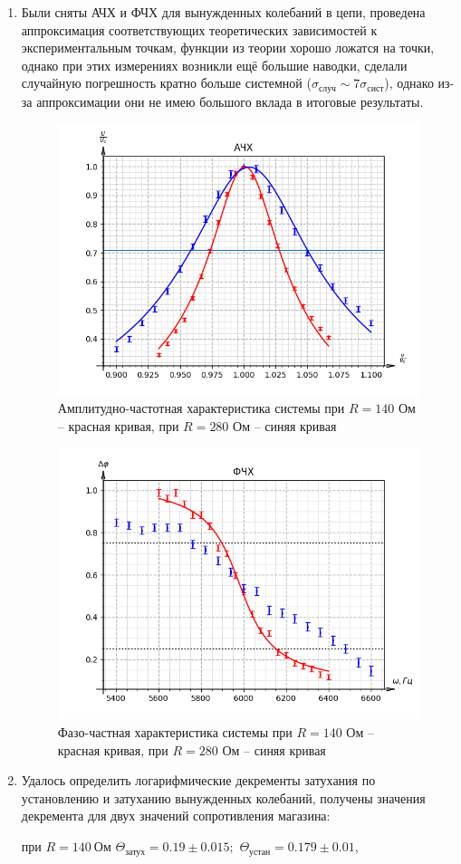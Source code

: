 \documentclass[a4paper,12pt]{extarticle}
\begin{document}
\begin{enumerate}
    \item Были сняты АЧХ и ФЧХ для вынужденных колебаний в цепи, проведена аппроксимация соответствующих теоретических зависимостей к экспериментальным точкам, функции из теории хорошо ложатся на точки, однако при этих измерениях возникли ещё большие наводки, сделали случайную погрешность кратно больше системной ($\sigma_\text{случ} \sim 7 \sigma_\text{сист}$), однако из-за аппроксимации они не имею большого вклада в итоговые результаты.
    \begin{figure}[h!]
    \centering
    \includegraphics[width=0.6\linewidth]{ACHH.png}
    \caption{Амплитудно-частотная характеристика системы при $R = 140$ Ом -- красная кривая, при $R = 280$ Ом -- синяя кривая}
    \end{figure}
    \begin{figure}[h!]
    \centering
    \includegraphics[width=0.6\linewidth]{FCHH.png}
    \caption{Фазо-частная характеристика системы при $R = 140$ Ом -- красная кривая, при $R = 280$ Ом -- синяя кривая}
    \end{figure}

    \item Удалось определить логарифмические декременты затухания по установлению и затуханию вынужденных колебаний, получены значения декремента для двух значений сопротивления магазина:

    при $R = 140 \ \text{Ом}$ $\Theta_\text{затух} = 0.19 \pm 0.015;$ $\Theta_\text{устан} = 0.179 \pm 0.01$,


\end{enumerate}
\end{document}
